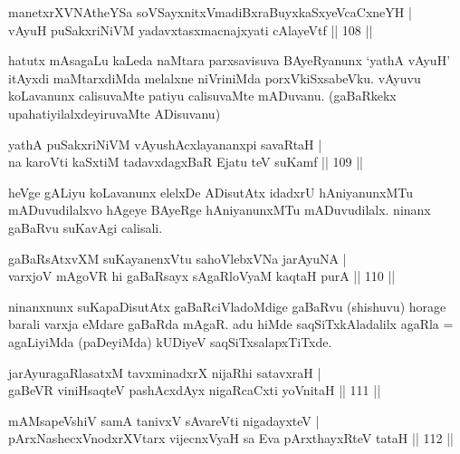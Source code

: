 \begin{shl}
manetxrXVNAtheYSa soVSayxnitxVmadiBxraBuyxkaSxyeVcaCxneYH | \\
vAyuH puSakxriNiVM yadavxtasxmacnajxyati cAlayeVtf \hfill|| 108 || 
\end{shl}

\begin{artha}
hatutx mAsagaLu kaLeda naMtara parxsavisuva BAyeRyanunx `yathA vAyuH' 
itAyxdi maMtarxdiMda melalxne niVriniMda porxVkiSxsabeVku. vAyuvu 
koLavanunx calisuvaMte patiyu calisuvaMte mADuvanu. (gaBaRkekx 
upahatiyilalxdeyiruvaMte ADisuvanu)
\end{artha}


\begin{shl}
yathA puSakxriNiVM vAyushAcxlayananxpi savaRtaH | \\
na karoVti kaSxtiM tadavxdagxBaR Ejatu teV suKamf \hfill|| 109 || 
\end{shl}

\begin{artha}
heVge gALiyu koLavanunx elelxDe ADisutAtx idadxrU hAniyanunxMTu 
mADuvudilalxvo hAgeye BAyeRge hAniyanunxMTu mADuvudilalx. ninanx 
gaBaRvu suKavAgi calisali.
\end{artha}

\begin{shl}
gaBaRsAtxvXM suKayanenxVtu sahoVlebxVNa jarAyuNA | \\
varxjoV mAgoVR hi gaBaRsayx sAgaRloV\s yaM kaqtaH purA \hfill|| 110 || 
\end{shl}

\begin{artha}
ninanxnunx suKapaDisutAtx gaBaRciVladoMdige gaBaRvu (shishuvu) horage 
barali varxja eMdare gaBaRda mAgaR. adu hiMde saqSiTxkAladalilx agaRla 
= agaLiyiMda (paDeyiMda) kUDiyeV saqSiTxsalapxTiTxde.
\end{artha}


\begin{shl}
jarAyuragaRlasatxM tavxminadxrX nijaRhi satavxraH | \\
gaBeVR viniHsaqteV pashAcxdAyx nigaRcaCxti yoVnitaH \hfill|| 111 || 
\end{shl}

\begin{shl}
mAMsapeVshiV samA tanivxV sA\s vareVti nigadayxteV | \\
pArxNashecxVnodxrXV\s tarx vijecnxVyaH sa Eva pArxthayxRteV tataH \hfill|| 112 || 
\end{shl}

